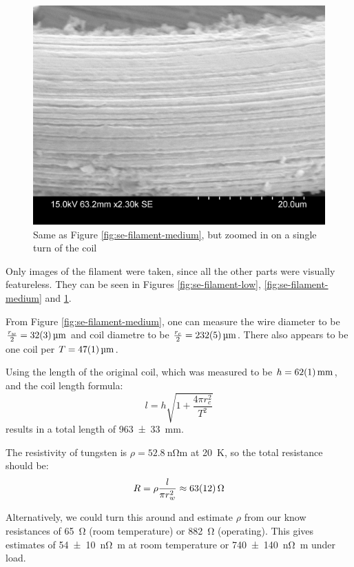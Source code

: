 \documentclass[a4paper]{scrartcl}
\begin{document}
\begin{figure}
    \centering
    \includegraphics[width = 15cm]{measurements/SE-filament-high.png}
    \caption{Same as Figure \ref{fig:se-filament-medium}, but zoomed in on a single turn of the coil}
    \label{fig:se-filament-high}
\end{figure}

Only images of the filament were taken, since all the other parts were visually featureless. They can be seen in Figures \ref{fig:se-filament-low}, \ref{fig:se-filament-medium} and \ref{fig:se-filament-high}.

From Figure \ref{fig:se-filament-medium}, one can measure the wire diameter to be \(\frac{r_w}{2} = \SI{32 \pm 3}{\micro\metre}\) and coil diametre to be \(\frac{r_c}{2} = \SI{232 \pm 5}{\micro\metre}\). There also appears to be one coil per \(T = \SI{47 \pm 1}{\micro\metre}\).

Using the length of the original coil, which was measured to be \(h = \SI{62 \pm 1}{\milli\metre}\), and the coil length formula:
\[l = h \sqrt{1 + \frac{4 \pi r_c^2}{T^2}}\]
results in a total length of \SI{963 \pm 33}{\milli\metre}.

The resistivity of tungsten is \(\rho = \SI{52.8}{\nano\ohm\metre}\) at \SI{20}{\kelvin}, so the total resistance should be:
\[R = \rho \frac{l}{\pi r_w^2} \approx \SI{63 \pm 12}{\ohm}\]

Alternatively, we could turn this around and estimate \(\rho\) from our know resistances of \SI{65}{\ohm} (room temperature) or \SI{882}{\ohm} (operating). This gives estimates of \SI{54 \pm 10}{\nano\ohm\metre} at room temperature or \SI{740 \pm 140}{\nano\ohm\metre} under load.
\end{document}
